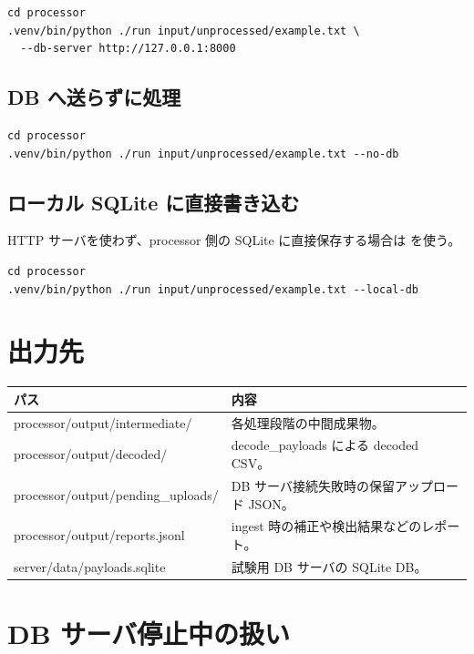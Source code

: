\documentclass[a4paper,11pt]{ltjsarticle}
\begin{document}
\begin{verbatim}
cd processor
.venv/bin/python ./run input/unprocessed/example.txt \
  --db-server http://127.0.0.1:8000
\end{verbatim}

\subsection{DB へ送らずに処理}

\begin{verbatim}
cd processor
.venv/bin/python ./run input/unprocessed/example.txt --no-db
\end{verbatim}

\subsection{ローカル SQLite に直接書き込む}

HTTP サーバを使わず、processor 側の SQLite に直接保存する場合は  を使う。

\begin{verbatim}
cd processor
.venv/bin/python ./run input/unprocessed/example.txt --local-db
\end{verbatim}

\section{出力先}

\begin{center}
\begin{tabular}{>{\ttfamily}p{72mm}p{76mm}}
\toprule
パス & 内容 \\
\midrule
processor/output/intermediate/ & 各処理段階の中間成果物。 \\
processor/output/decoded/ & decode\_payloads による decoded CSV。 \\
processor/output/pending\_uploads/ & DB サーバ接続失敗時の保留アップロード JSON。 \\
processor/output/reports.jsonl & ingest 時の補正や検出結果などのレポート。 \\
server/data/payloads.sqlite & 試験用 DB サーバの SQLite DB。 \\
\bottomrule
\end{tabular}
\end{center}

\section{DB サーバ停止中の扱い}
\end{document}
